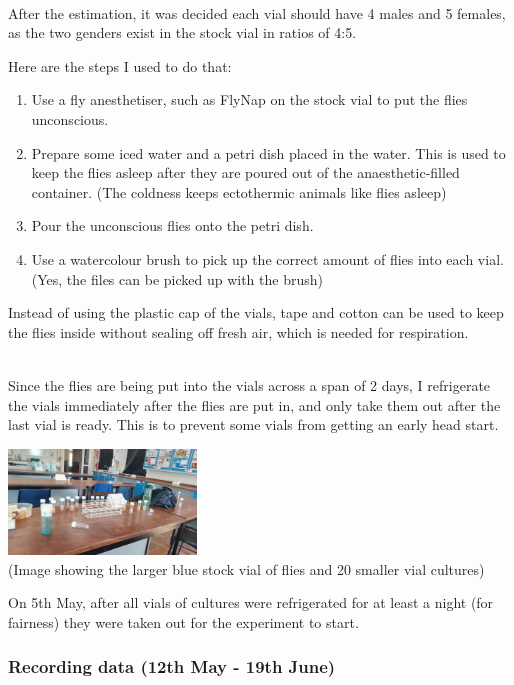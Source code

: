 \documentclass{article}
\begin{document}
\noindent\\
After the estimation, it was decided each vial should have 4 males and 5 females, as the two genders exist in the stock vial in ratios of 4:5.

\newpage
\noindent
Here are the steps I used to do that:

\begin{enumerate}
    \item Use a fly anesthetiser, such as FlyNap on the stock vial to put the flies unconscious.
    \item Prepare some iced water and a petri dish placed in the water. This is used to keep the flies asleep after they are poured out of the anaesthetic-filled container. (The coldness keeps ectothermic animals like flies asleep)
    \item Pour the unconscious flies onto the petri dish.
    \item Use a watercolour brush to pick up the correct amount of flies into each vial. (Yes, the files can be picked up with the brush)
\end{enumerate}

\noindent
Instead of using the plastic cap of the vials, tape and cotton can be used to keep the flies inside without sealing off fresh air, which is needed for respiration.

\noindent\\
Since the flies are being put into the vials across a span of 2 days, I refrigerate the vials immediately after the flies are put in, and only take them out after the last vial is ready. This is to prevent some vials from getting an early head start.

\begin{center}
\includegraphics[width=5cm]{to-vials}
\noindent\\
(Image showing the larger blue stock vial of flies and 20 smaller vial cultures)
\end{center}

\noindent
On 5th May, after all vials of cultures were refrigerated for at least a night (for fairness) they were taken out for the experiment to start.

\subsubsection{Recording data (12th May - 19th June)}
\end{document}
